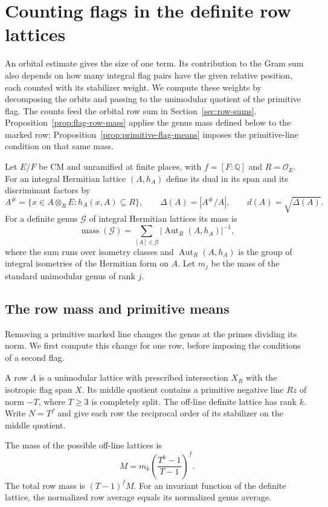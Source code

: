 \section{Counting flags in the definite row lattices}\label{sec:flag-counts}

An orbital estimate gives the size of one term. Its contribution to the Gram sum also depends on how many integral flag pairs have the given relative position, each counted with its stabilizer weight. We compute
these weights by decomposing the orbits and passing to the
unimodular quotient of the primitive flag. The counts feed
the orbital row sum in Section~\ref{sec:row-sums}. Proposition~\ref{prop:flag-row-mass} applies the genus mass defined below to the marked row; Proposition~\ref{prop:primitive-flag-means} imposes the primitive-line condition on that same mass.

Let \(E/F\) be CM and unramified at finite places, with
\(f=[F:\mathbb Q]\) and \(R=\mathcal O_E\). For an integral Hermitian lattice \((A,h_A)\) define its dual in its span and its discriminant factors by
\[
 A^\#=\{x\in A\otimes_R E:h_A(x,A)\subseteq R\},\qquad \Delta(A)=|A^\#/A|,\qquad d(A)=\sqrt{\Delta(A)}.
\]
For a definite genus \(\mathcal G\) of integral Hermitian lattices its mass is 
\[
 \operatorname{mass}(\mathcal G)=\sum_{[A]\in\mathcal G}|\operatorname{Aut}_R(A,h_A)|^{-1},
\]
 where the sum runs over isometry classes and \(\operatorname{Aut}_R(A,h_A)\) is the group of integral isometries of the Hermitian form on \(A\). Let \(m_j\)
be the mass of the standard unimodular genus of rank \(j\).

\subsection{The row mass and primitive means}

Removing a primitive marked line changes the genus at the primes dividing its norm. We first compute this change for one row, before imposing the conditions of a second flag.

A row \(\Lambda\) is a unimodular lattice with prescribed
intersection \(X_R\) with the isotropic flag span \(X\).
Its middle quotient contains a primitive negative line \(Rz\)
of norm \(-T\), where \(T\geq3\) is completely split. The
off-line definite lattice has rank \(k\). Write \(N=T^f\)
and give each row the reciprocal order of its stabilizer
on the middle quotient.

\begin{proposition}\label{prop:flag-row-mass}
The mass of the possible off-line lattices is
\[
 M=m_k\left(\frac{T^k-1}{T-1}\right)^f.
\]
The total row mass is \((T-1)^f M\). For an invariant
function of the definite lattice, the normalized row
average equals its normalized genus average.
\end{proposition}

